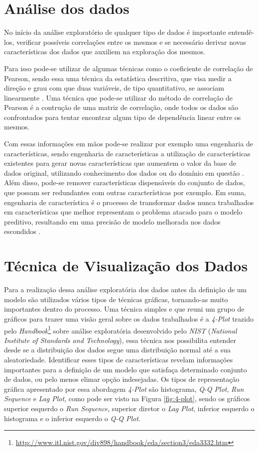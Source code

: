 \section{Análise dos dados}

No início da análise exploratório de qualquer tipo de dados é importante
entendê-los, verificar possíveis correlações entre os mesmos e se necessário
derivar novas características dos dados que auxiliem na exploração dos mesmos.

Para isso pode-se utilizar de algumas técnicas como o coeficiente de correlação
de Pearson, sendo essa uma técnica da estatística descritiva, que visa medir a
direção e grau com que duas variáveis, de tipo quantitativo, se associam
linearmente \cite{rossman:1996}. Uma técnica que pode-se utilizar do método de
correlação de Pearson é a contrução de uma matriz de correlação, onde todos os
dados são confrontados para tentar encontrar algum tipo de dependência linear
entre os mesmos. 

Com essas informações em mãos pode-se realizar por exemplo uma engenharia de
características, sendo engenharia de características a utilização de
características existentes para gerar novas características que aumentem o valor
da base de dados original, utilizando conhecimento dos dados ou do domínio em
questão \cite{brink:2014}. Além disso, pode-se remover características
dispensáveis do conjunto de dados, que possam ser redundantes com outras
características por exemplo. Em suma, engenharia de característica é o processo
de transformar dados nunca trabalhados em características que melhor representam
o problema atacado para o modelo preditivo, resultando em uma precisão de modelo
melhorada nos dados escondidos \cite{brownlee:2014}.

\section{Técnica de Visualização dos Dados}\label{4-plot}

Para a realização dessa análise exploratória dos dados antes da definição de um
modelo são utilizados vários tipos de técnicas gráficas, tornando-as muito
importantes dentro do processo. Uma técnica simples e que reuni um grupo de
gráficos para trazer uma visão geral sobre os dados trabalhados é a
\textit{4-Plot} trazido pelo
\textit{Handbook}\footnote{\url{http://www.itl.nist.gov/div898/handbook/eda/section3/eda3332.htm}}
sobre análise exploratória desenvolvido pelo \textit{NIST} (\textit{National
Institute of Standards and Technology}), essa técnica nos possibilita entender
desde se a distribuição dos dados segue uma distribuição normal até a sua
aleatoriedade. Identificar esses tipos de características revelam informações
importantes para a definição de um modelo que satisfaça determinado conjunto de
dados, ou pelo menos elimar opção indesejadas. Os tipos de representação gráfica
apresentado por essa abordagem \textit{4-Plot} são histograma, \textit{Q-Q
Plot}, \textit{Run Sequence} e \textit{Lag Plot}, como pode ser visto na Figura
\ref{fig:4-plot}, sendo os gráficos superior esquerdo o \textit{Run Sequence},
superior diretor o \textit{Lag Plot}, inferior esquerdo o histograma e o
inferior esquerdo o \textit{Q-Q Plot}.

